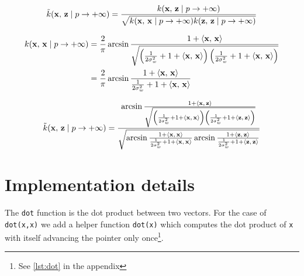 \begin{equation}
	\tilde{k}(\mathbf{x},\,\mathbf{z} \mid p \to + \infty) = \frac{
		k(\mathbf{x},\,\mathbf{z} \mid p \to + \infty) }{
		\sqrt{
			k(\mathbf{x},\,\mathbf{x} \mid p \to + \infty)
			k(\mathbf{z},\,\mathbf{z} \mid p \to + \infty)
		}
	}
\end{equation}

\begin{align*}
	k(\mathbf{x},\,\mathbf{x} \mid p \to + \infty)
	 & = \frac{2}{\pi}
	\arcsin \frac{1 + \left\langle \mathbf{x},\,\mathbf{x} \right\rangle}{\sqrt{
			\left(
			\frac{1}{2\sigma_w^2} + 1 + \left\langle \mathbf{x},\,\mathbf{x} \right\rangle
			\right)
			\left(
			\frac{1}{2\sigma_w^2} + 1 + \left\langle \mathbf{x},\,\mathbf{x} \right\rangle
			\right)
	}}                 \\
	 & = \frac{2}{\pi}
	\arcsin \frac{1 + \left\langle \mathbf{x},\,\mathbf{x} \right\rangle}{
		\frac{1}{2\sigma_w^2} + 1 + \left\langle \mathbf{x},\,\mathbf{x} \right\rangle
	}                  \\
\end{align*}

\begin{equation}
	\tilde{k}(\mathbf{x},\,\mathbf{z} \mid p \to + \infty) =
	\frac{
		\arcsin \frac{1 + \left\langle \mathbf{x},\,\mathbf{z} \right\rangle}{\sqrt{
				\left(
				\frac{1}{2\sigma_w^2} + 1 + \left\langle \mathbf{x},\,\mathbf{x} \right\rangle
				\right)
				\left(
				\frac{1}{2\sigma_w^2} + 1 + \left\langle \mathbf{z},\,\mathbf{z} \right\rangle
				\right)
			}}
	}{
		\sqrt{
			\arcsin \frac{1 + \left\langle \mathbf{x},\,\mathbf{x} \right\rangle}{
				\frac{1}{2\sigma_w^2} + 1 + \left\langle \mathbf{x},\,\mathbf{x} \right\rangle
			}
			\arcsin \frac{1 + \left\langle \mathbf{z},\,\mathbf{z} \right\rangle}{
				\frac{1}{2\sigma_w^2} + 1 + \left\langle \mathbf{z},\,\mathbf{z} \right\rangle
			}
		}
	}
\end{equation}

\section{Implementation details}

The \texttt{dot} function is the dot product between two vectors. For
the case of \texttt{dot(x,x)} we add a helper function \texttt{dot(x)} which computes
the dot product of \texttt{x} with itself advancing the pointer only once\footnote{See \cref{lst:dot} in the appendix}.

